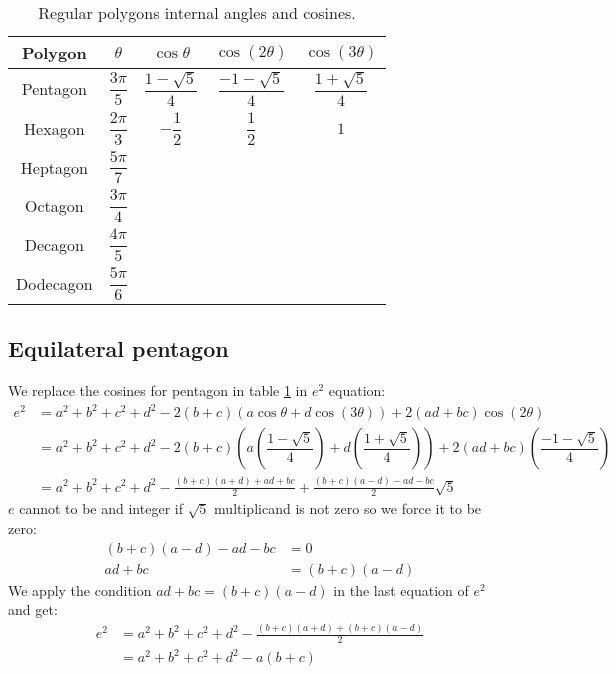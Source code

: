 \documentclass[11pt]{article}
\begin{document}
\begin{table}[h]
\centering
\begin{tabular}{|c c c c c|}\hline
Polygon & $\theta$ & $\cos\theta$ & $\cos(2\theta)$ & $\cos(3\theta)$ \rule[-2ex]{0pt}{6ex}\\ \hline\hline 
Pentagon & $\dfrac{3\pi}{5}$ & $\dfrac{1-\sqrt{5}}{4}$ & $\dfrac{-1-\sqrt{5}}{4}$ & $\dfrac{1+\sqrt{5}}{4}$\rule[-2ex]{0pt}{6ex}\\ \hline
Hexagon & $\dfrac{2\pi}{3}$ & $-\dfrac{1}{2}$ & $\dfrac{1}{2}$ & $1$ \rule[-2ex]{0pt}{6ex}\\ \hline
Heptagon & $\dfrac{5\pi}{7}$ &  &  & \rule[-2ex]{0pt}{6ex}\\ \hline
Octagon & $\dfrac{3\pi}{4}$ &  &  & \rule[-2ex]{0pt}{6ex}\\ \hline
Decagon & $\dfrac{4\pi}{5}$ &  &  & \rule[-2ex]{0pt}{6ex}\\ \hline
Dodecagon & $\dfrac{5\pi}{6}$ &  &  & \rule[-2ex]{0pt}{6ex}\\ \hline

\end{tabular}
\caption{Regular polygons internal angles and cosines.}
\label{tbl:polygons}
\end{table}

\subsection{Equilateral pentagon}

We replace the cosines for pentagon in table \ref{tbl:polygons} in $e^2$ equation:
\begin{align}
e^2 &= a^2 +b^2 +c^2 +d^2 -2(b+c)(a\cos{\theta} + d\cos(3\theta)) +2(ad+bc)\cos{(2\theta)} \nonumber\\
 &= a^2 +b^2 +c^2 +d^2 
  -2(b+c)\left(a\left(\dfrac{1-\sqrt{5}}{4}\right) + d\left(\dfrac{1+\sqrt{5}}{4}\right)\right) 
  +2(ad+bc)\left(\dfrac{-1-\sqrt{5}}{4}\right) \nonumber\\
 &= a^2 +b^2 +c^2 +d^2 - \frac{(b+c)(a+d)+ad+bc}{2} + \frac{(b+c)(a-d)-ad-bc}{2}\sqrt{5}
\end{align}
$e$ cannot to be and integer if $\sqrt{5}$ multiplicand is not zero so we force it to be zero:
\begin{align}
(b+c)(a-d)-ad-bc &= 0 \nonumber\\
 ad+bc &= (b+c)(a-d)
\end{align}
We apply the condition $ad+bc=(b+c)(a-d)$ in the last equation of $e^2$ and get:
\begin{align}
e^2 &= a^2 +b^2 +c^2 +d^2 - \frac{(b+c)(a+d)+(b+c)(a-d)}{2} \nonumber\\
 &= \boxed{ a^2 +b^2 +c^2 +d^2 - a(b+c) }
\end{align}
\end{document}
